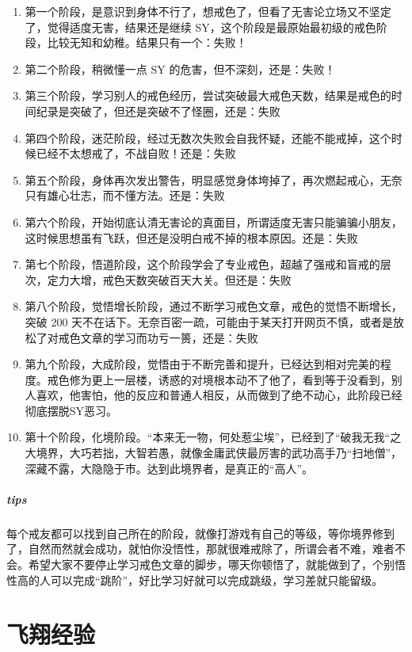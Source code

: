 \documentclass{ctexart}
\begin{document}
\begin{enumerate}
    \item 第一个阶段，是意识到身体不行了，想戒色了，但看了无害论立场又不坚定了，觉得适度无害，结果还是继续 SY，这个阶段是最原始最初级的戒色阶段，比较无知和幼稚。结果只有一个：失败！
    \item 第二个阶段，稍微懂一点 SY 的危害，但不深刻，还是：失败！
    \item 第三个阶段，学习别人的戒色经历，尝试突破最大戒色天数，结果是戒色的时间纪录是突破了，但还是突破不了怪圈，还是：失败
    \item 第四个阶段，迷茫阶段，经过无数次失败会自我怀疑，还能不能戒掉，这个时候已经不太想戒了，不战自败！还是：失败
    \item 第五个阶段，身体再次发出警告，明显感觉身体垮掉了，再次燃起戒心，无奈只有雄心壮志，而不懂方法。还是：失败
    \item 第六个阶段，开始彻底认清无害论的真面目，所谓适度无害只能骗骗小朋友，这时候思想虽有飞跃，但还是没明白戒不掉的根本原因。还是：失败
    \item 第七个阶段，悟道阶段，这个阶段学会了专业戒色，超越了强戒和盲戒的层次，定力大增，戒色天数突破百天大关。但还是：失败
    \item 第八个阶段，觉悟增长阶段，通过不断学习戒色文章，戒色的觉悟不断增长，突破 200 天不在话下。无奈百密一疏，可能由于某天打开网页不慎，或者是放松了对戒色文章的学习而功亏一篑，还是：失败
    \item 第九个阶段，大成阶段，觉悟由于不断完善和提升，已经达到相对完美的程度。戒色修为更上一层楼，诱惑的对境根本动不了他了，看到等于没看到，别人喜欢，他害怕，他的反应和普通人相反，从而做到了绝不动心，此阶段已经彻底摆脱SY恶习。
    \item 第十个阶段，化境阶段。“本来无一物，何处惹尘埃”，已经到了“破我无我“之大境界，大巧若拙，大智若愚，就像金庸武侠最厉害的武功高手乃“扫地僧”，深藏不露，大隐隐于市。达到此境界者，是真正的“高人”。
\end{enumerate}

\subparagraph{tips} 每个戒友都可以找到自己所在的阶段，就像打游戏有自己的等级，等你境界修到了，自然而然就会成功，就怕你没悟性，那就很难戒除了，所谓会者不难，难者不会。希望大家不要停止学习戒色文章的脚步，哪天你顿悟了，就能做到了，个别悟性高的人可以完成“跳阶”，好比学习好就可以完成跳级，学习差就只能留级。

\section{飞翔经验}
\end{document}

